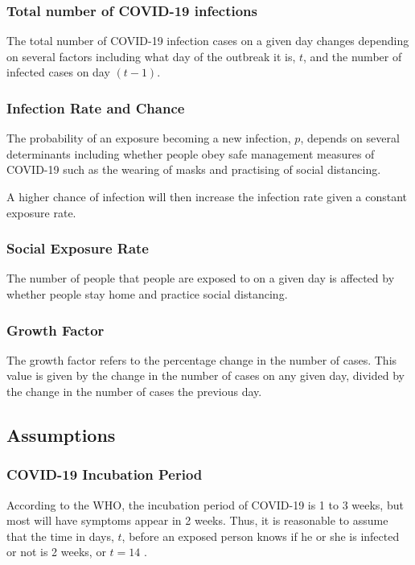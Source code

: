 \documentclass[a4paper,titlepage]{article}
\begin{document}
\subsubsection{Total number of COVID-19 infections}

The total number of COVID-19 infection cases on a given day changes depending on several factors including what day of the outbreak it is, $t$, and the number of infected cases on day $(t-1)$.

\subsubsection{Infection Rate and Chance}

The probability of an exposure becoming a new infection, $p$, depends on several determinants including whether people obey safe management measures of COVID-19 such as the wearing of masks and practising of social distancing.

A higher chance of infection will then increase the infection rate given a constant exposure rate.

\subsubsection{Social Exposure Rate}

The number of people that people are exposed to on a given day is affected by whether people stay home and practice social distancing.

\subsubsection{Growth Factor}

The growth factor refers to the percentage change in the number of cases. This value is given by the change in the number of cases on any given day, divided by the change in the number of cases the previous day. 

\subsection{Assumptions}

\subsubsection{COVID-19 Incubation Period}

According to the WHO, the incubation period of COVID-19 is 1 to 3 weeks, but most will have symptoms appear in 2 weeks. Thus, it is reasonable to assume that the time in days, $t$, before an exposed person knows if he or she is infected or not is 2 weeks, or $t=14$ \cite{incubation_who_2020}.
\end{document}
